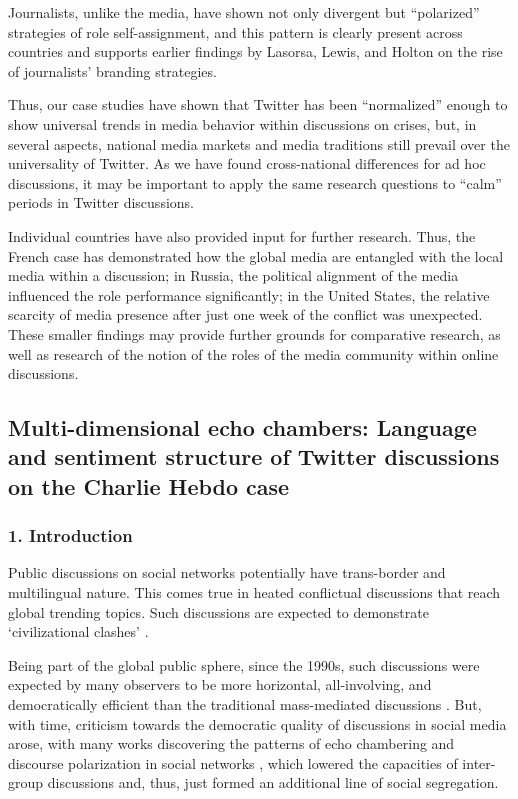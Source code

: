 Journalists, unlike the media, have shown not only divergent but “polarized” strategies of role self-assignment, and this pattern is clearly present across countries and supports earlier findings by Lasorsa, Lewis, and Holton \cite{LasorsaLewisHolton} on the rise of journalists’ branding strategies.

Thus, our case studies have shown that Twitter has been “normalized” enough to show universal trends in media behavior within discussions on crises, but, in several aspects, national media markets and media traditions still prevail over the universality of Twitter. As we have found cross-national differences for ad hoc discussions, it may be important to apply the same research questions to “calm” periods in Twitter discussions.

Individual countries have also provided input for further research. Thus, the French case has demonstrated how the global media are entangled with the local media within a discussion; in Russia, the political alignment of the media influenced the role performance significantly; in the United States, the relative scarcity of media presence after just one week of the conflict was unexpected. These smaller findings may provide further grounds for comparative research, as well as research of the notion of the roles of the media community within online discussions.


\subsection{Multi-dimensional echo chambers: Language and sentiment structure of Twitter discussions on the Charlie Hebdo case}\label{subsec:ch5/sec1/sub3}

\subsubsection{1. Introduction}

Public discussions on social networks potentially have trans-border and multilingual nature. This comes true in heated conflictual discussions that reach global trending topics. Such discussions are expected to demonstrate ‘civilizational clashes’ \cite{AnKwakMejova}.

Being part of the global public sphere, since the 1990s, such discussions were expected by many observers to be more horizontal, all-involving, and democratically efficient \cite{Fuchs} than the traditional mass-mediated discussions \cite{McQuail}. But, with time, criticism towards the democratic quality of discussions in social media arose, with many works discovering the patterns of echo chambering and discourse polarization in social networks \cite{Sunstein2001,Sunstein2002,BarberaJostNagler,BastosMerceaBaronchelli,ColleoniRozzaArvidsson,ConoverRatkiewiczFrancisco}, which lowered the capacities of inter-group discussions and, thus, just formed an additional line of social segregation.

